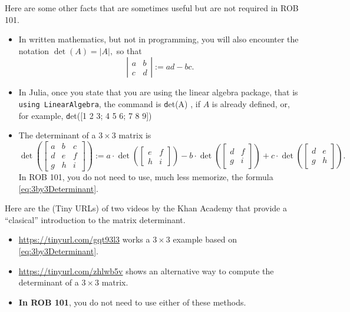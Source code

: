 \vspace*{0.2cm}

Here are some other facts that are sometimes useful but are not required in ROB 101.

\begin{itemize}

 \item In written mathematics, but not in programming, you will also encounter the notation $\det(A) = \left| A \right|,$ so that
  $$\left|\begin{array}{cc} a & b \\ c & d  \end{array} \right|:=ad-bc. $$
  

  \item In Julia, once you state that you are using the linear algebra package, that is \texttt{ using LinearAlgebra}, the command is
  {\texttt  det(A)} , if $A$ is already defined, or, for example, {\texttt  det([1 2 3; 4 5 6; 7 8 9])}
 
  \item The determinant of a $3 \times 3$ matrix is 
\begin{equation}
 \label{eq:3by3Determinant}
  \det \left(  \left[\begin{array}{ccc} a & b & c\\ d & e & f \\ g & h & i \end{array} \right] \right):= a \cdot \det \left(\left[\begin{array}{cc} e & f \\ h & i  \end{array} \right] \right) - b \cdot \det \left(\left[\begin{array}{cc}d & f \\ g & i  \end{array} \right] \right) + c \cdot \det \left(\left[\begin{array}{cc} d & e \\ g & h  \end{array} \right] \right).
\end{equation}
In ROB 101, you do not need to use, much less memorize, the formula \eqref{eq:3by3Determinant}.   

 
\end{itemize}
\vspace*{.2cm}
\begin{tcolorbox}[title=\textbf{Optional, and for sure, skip on your first read: Khan Academy} ]
Here are the (Tiny URLs) of two videos by the Khan Academy that provide a ``clasical'' introduction to the matrix determinant. 
  \begin{itemize}
      \item \url{https://tinyurl.com/gqt93l3} works a $3\times 3$ example based on \eqref{eq:3by3Determinant}.
      \item  \url{https://tinyurl.com/zhlwb5v} shows an alternative way to compute the determinant of a $3 \times 3$ matrix.
      \item \textbf{In ROB 101}, you do not need to use either of these methods.
  \end{itemize}
\end{tcolorbox}

